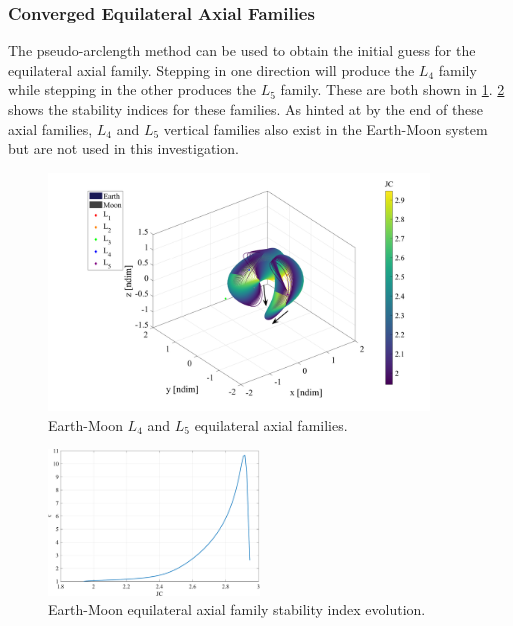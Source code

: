 \subsubsection{Converged Equilateral Axial Families}
The pseudo-arclength method can be used to obtain the initial guess for the equilateral axial
family. Stepping in one direction will produce the $L_{4}$ family while stepping in the other
produces the $L_{5}$ family. These are both shown in \cref{fig:eqAxial}.
\cref{fig:eqAxialStability} shows the stability indices for these families. As hinted at by the end
of these axial families, $L_{4}$ and $L_{5}$ vertical families also exist in the Earth-Moon system
but are not used in this investigation.

\begin{figure}[ht]
    \centering
    \includegraphics[width=0.9\textwidth]{figures/EquilateralAxialFamily.pdf}
    \caption{Earth-Moon $L_{4}$ and $L_{5}$ equilateral axial families.}
    \label{fig:eqAxial}
\end{figure}

\begin{figure}[ht]
    \centering
    \includegraphics[width=0.5\textwidth]{figures/EquilateralAxialStability.pdf}
    \caption{Earth-Moon equilateral axial family stability index evolution.}
    \label{fig:eqAxialStability}
\end{figure}

